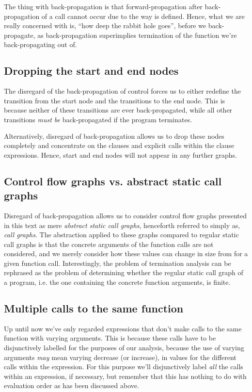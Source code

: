 The thing with back-propagation is that forward-propagation after
back-propagation of a call cannot occur due to the way \D{} is defined. Hence,
what we are really concerned with is, ``how deep the rabbit hole goes'', before
we back-propagate, as back-propagation superimplies termination of the function
we're back-propagating out of.

\subsection{Dropping the start and end nodes}

The disregard of the back-propagation of control forces us to either redefine
the transition from the start node and the transitions to the end node. This is
because neither of these transitions are ever back-propagated, while all other
transitions \emph{must be} back-propagated if the program terminates.

Alternatively, disregard of back-propagation allows us to drop these nodes
completely and concentrate on the clauses and explicit calls within the clause
expressions. Hence, start and end nodes will not appear in any further graphs.

\subsection{Control flow graphs vs. abstract static call graphs}

Disregard of back-propagation allows us to consider control flow graphs
presented in this text as mere \emph{abstract static call graphs}, henceforth
referred to simply as, \emph{call graphs}. The abstraction applied to these
graphs compared to regular static call graphs is that the concrete arguments of
the function calls are not considered, and we merely consider how these values
can change in size from for a given function call. Interestingly, the problem
of termination analysis can be rephrased as the problem of determining whether
the regular static call graph of a program, i.e. the one containing the
concrete function arguments, is finite.

\subsection{Multiple calls to the same function}

Up until now we've only regarded expressions that don't make calls to the same
function with varying arguments. This is because these calls have to be
disjunctively labelled for the purposes of our analysis, because the use of
varying arguments \emph{may} mean varying decrease (or increase), in values for
the different calls within the expression. For this purpose we'll disjunctively
label \emph{all} the calls within an expression, if necessary, but remember
that this has nothing to do with evaluation order as has been discussed above.

